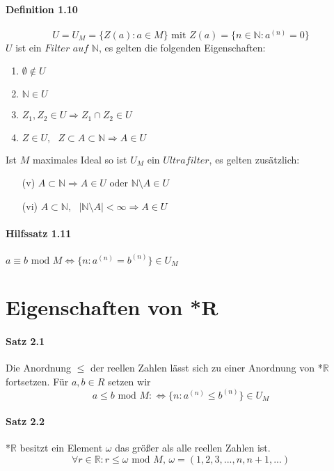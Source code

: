 \documentclass[a4paper]{article}
\begin{document}
\paragraph{Definition 1.10}  
$$ U = U_M = \{Z(a): a \in M\} \text{ mit } Z(a) = \{n \in \mathbb{N}: a^{(n)} = 0\} $$
$U $ ist ein $\textit{Filter auf } \mathbb{N} $, es gelten die folgenden Eigenschaften: 
\begin{enumerate}
      \item $ \emptyset \notin U $      
      \item $ \mathbb{N} \in U$ 
      \item $ Z_1, Z_2 \in U \Rightarrow Z_1 \cap Z_2 \in U$ 
      \item $ Z \in U, \text{ } Z \subset A \subset \mathbb{N} \Rightarrow A \in U$ 

\end{enumerate}
Ist $ M $ maximales Ideal so ist $ U_M $ ein $ Ultrafilter $, es gelten zusätzlich: 
\begin{enumerate}
      \item[(v)] $ A \subset  \mathbb{N} \Rightarrow A \in U \text{ oder } \mathbb{N} \setminus A \in U$ 
      \item[(vi)] $ A \subset  \mathbb{N}, \text{ } |\mathbb{N} \setminus A| < \infty \Rightarrow A \in U$ 
\end{enumerate}

\paragraph{Hilfssatz 1.11} $a \equiv b \text{ mod } M \iff \{n: a^{(n)} = b^{(n)}\} \in U_M$



\section{Eigenschaften von *R}

\paragraph{Satz 2.1} Die Anordnung $\leqslant$ der reellen Zahlen lässt 
sich zu einer Anordnung von *$\mathbb{R}$ fortsetzen. Für $ a,b \in R $ setzen wir
$$ a \leqslant b \text{ mod } M :\iff \{n: a^{(n)} \leqslant b^{(n)}\} \in U_M $$ 


\paragraph{Satz 2.2} *$\mathbb{R}$ besitzt ein Element $ \omega $ das größer als alle reellen Zahlen ist. 
$$ \forall r \in \mathbb{R} : r \leqslant \omega \text{ mod } M \text{, } \omega = (1,2,3,...,n,n+1,...) $$
\end{document}
